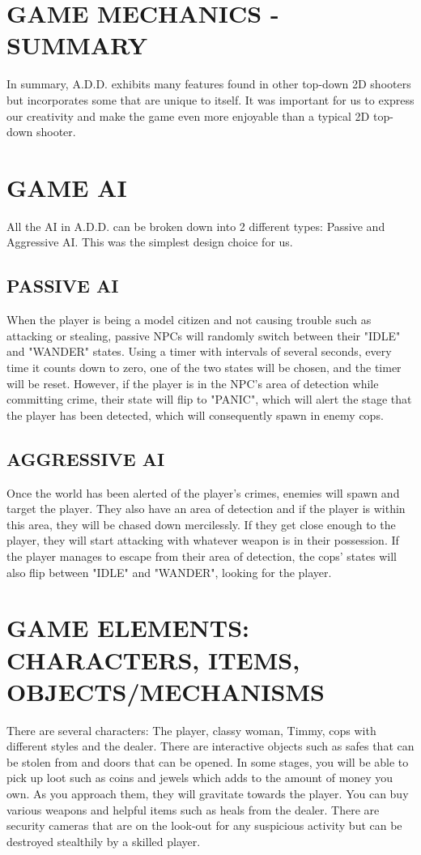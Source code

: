 \documentclass{article}
\begin{document}
\section{GAME MECHANICS - SUMMARY \label{mechanicssumm}}
In summary, A.D.D. exhibits many features found in other top-down 2D shooters but incorporates some that are unique to itself. It was important for us to express our creativity and make the game even more enjoyable than a typical 2D top-down shooter.

\section{GAME AI \label{ai}}
All the AI in A.D.D. can be broken down into 2 different types: Passive and Aggressive AI. This was the simplest design choice for us. 


\subsection{PASSIVE AI \label{passAI}}
When the player is being a model citizen and not causing trouble such as attacking or stealing, passive NPCs will randomly switch between their "IDLE" and "WANDER" states. Using a timer with intervals of several seconds, every time it counts down to zero, one of the two states will be chosen, and the timer will be reset. However, if the player is in the NPC's area of detection while committing crime, their state will flip to "PANIC", which will alert the stage that the player has been detected, which will consequently spawn in enemy cops.

\subsection{AGGRESSIVE AI \label{aggAI}}
Once the world has been alerted of the player's crimes, enemies will spawn and target the player. They also have an area of detection and if the player is within this area, they will be chased down mercilessly. If they get close enough to the player, they will start attacking with whatever weapon is in their possession. If the player manages to escape from their area of detection, the cops' states will also flip between "IDLE" and "WANDER", looking for the player.

\section{GAME ELEMENTS: CHARACTERS, ITEMS, OBJECTS/MECHANISMS \label{elements}}
There are several characters: The player, classy woman, Timmy, cops with different styles and the dealer. There are interactive objects such as safes that can be stolen from and doors that can be opened. In some stages, you will be able to pick up loot such as coins and jewels which adds to the amount of money you own. As you approach them, they will gravitate towards the player. You can buy various weapons and helpful items such as heals from the dealer. There are security cameras that are on the look-out for any suspicious activity but can be destroyed stealthily by a skilled player.
\end{document}
